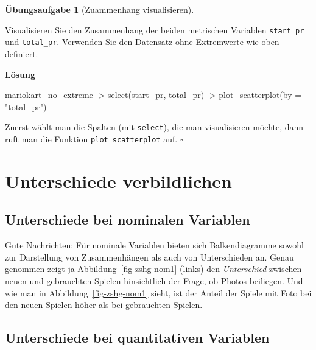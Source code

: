 \documentclass[
  letterpaper,
  oneside,
  open=any]{scrbook}
\newenvironment{Shaded}{\begin{snugshade}}{\end{snugshade}}
\newcommand{\AttributeTok}[1]{\textcolor[rgb]{0.40,0.45,0.13}{#1}}
\newcommand{\FunctionTok}[1]{\textcolor[rgb]{0.28,0.35,0.67}{#1}}
\newcommand{\NormalTok}[1]{\textcolor[rgb]{0.00,0.23,0.31}{#1}}
\newcommand{\SpecialCharTok}[1]{\textcolor[rgb]{0.37,0.37,0.37}{#1}}
\newcommand{\StringTok}[1]{\textcolor[rgb]{0.13,0.47,0.30}{#1}}
\theoremstyle{definition}
\newtheorem{exercise}{Übungsaufgabe}[chapter]
\theoremstyle{definition}
\theoremstyle{definition}
\theoremstyle{remark}
\begin{document}
\begin{exercise}[Zuammenhang
visualisieren]\protect\hypertarget{exr-zsmnhang-metrisch}{}\label{exr-zsmnhang-metrisch}

Visualisieren Sie den Zusammenhang der beiden metrischen Variablen
\texttt{start\_pr} und \texttt{total\_pr}. Verwenden Sie den Datensatz
ohne Extremwerte wie oben definiert.

\textbf{Lösung}

\begin{Shaded}
\begin{Highlighting}[]
\NormalTok{mariokart\_no\_extreme }\SpecialCharTok{|\textgreater{}} 
  \FunctionTok{select}\NormalTok{(start\_pr, total\_pr) }\SpecialCharTok{|\textgreater{}} 
  \FunctionTok{plot\_scatterplot}\NormalTok{(}\AttributeTok{by =} \StringTok{"total\_pr"}\NormalTok{)}
\end{Highlighting}
\end{Shaded}

Zuerst wählt man die Spalten (mit \texttt{select}), die man
visualisieren möchte, dann ruft man die Funktion
\texttt{plot\_scatterplot} auf. \(\square\)

\end{exercise}

\section{Unterschiede verbildlichen}\label{unterschiede-verbildlichen}

\subsection{Unterschiede bei nominalen
Variablen}\label{unterschiede-bei-nominalen-variablen}

Gute Nachrichten: Für nominale Variablen bieten sich Balkendiagramme
sowohl zur Darstellung von Zusammenhängen als auch von Unterschieden an.
Genau genommen zeigt ja Abbildung~\ref{fig-zshg-nom1} (links) den
\emph{Unterschied} zwischen neuen und gebrauchten Spielen hinsichtlich
der Frage, ob Photos beiliegen. Und wie man in
Abbildung~\ref{fig-zshg-nom1} sieht, ist der Anteil der Spiele mit Foto
bei den neuen Spielen höher als bei gebrauchten Spielen.

\subsection{Unterschiede bei quantitativen
Variablen}\label{unterschiede-bei-quantitativen-variablen}
\end{document}
